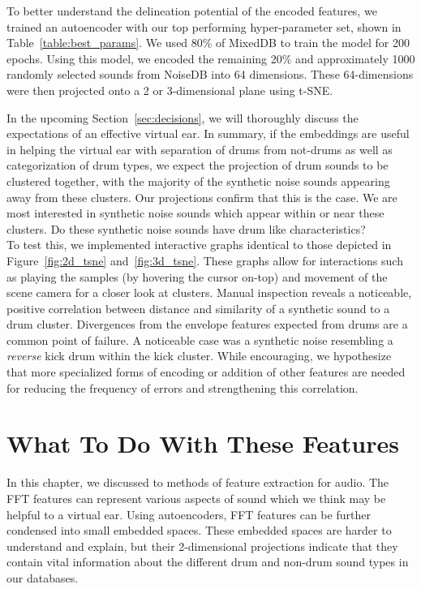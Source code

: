 \documentclass[\main/thesis.tex]{subfiles}
\begin{document}
To better understand the delineation potential of the encoded features,  we trained an autoencoder with our top performing hyper-parameter set, shown in Table~\ref{table:best_params}. We used 80\% of MixedDB to train the model for 200 epochs. Using this model, we encoded the remaining 20\% and approximately 1000 randomly selected sounds from NoiseDB into 64 dimensions. These 64-dimensions were then projected onto a 2 or 3-dimensional plane using t-SNE. 

In the upcoming Section~\ref{sec:decisions}, we will thoroughly discuss the expectations of an effective virtual ear. In summary, if the embeddings are useful in helping the virtual ear with separation of drums from not-drums as well as categorization of drum types, we expect the projection of drum sounds to be clustered together, with the majority of the synthetic noise sounds appearing away from these clusters. Our projections confirm that this is the case. We are most interested in synthetic noise sounds which appear within or near these clusters. Do these synthetic noise sounds have drum like characteristics?\\ 

To test this, we implemented interactive graphs identical to those depicted in Figure~\ref{fig:2d_tsne} and~\ref{fig:3d_tsne}. These graphs allow for interactions such as playing the samples (by hovering the cursor on-top) and movement of the scene camera for a closer look at clusters.  Manual inspection reveals a noticeable, positive correlation between distance and similarity of a synthetic sound to a drum cluster. Divergences from the envelope features expected from drums are a common point of failure. A noticeable case was a synthetic noise resembling a \emph{reverse} kick drum within the kick cluster. While encouraging, we hypothesize that more specialized forms of encoding or addition of other features are needed for reducing the frequency of errors and strengthening this correlation.
\section{What To Do With These Features}
In this chapter, we discussed to methods of feature extraction for audio. The FFT features can represent various aspects of sound which we think may be helpful to a virtual ear. Using autoencoders, FFT features can be further condensed into small embedded spaces. These embedded spaces are harder to understand and explain, but their 2-dimensional projections indicate that they contain vital information about the different drum and non-drum sound types in our databases. 
\end{document}
